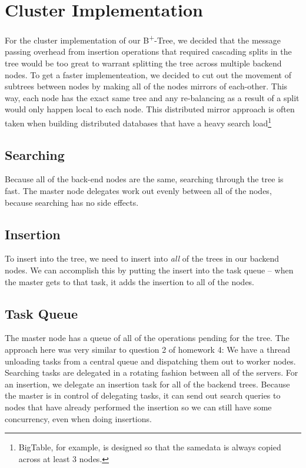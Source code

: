 \documentclass[conference]{IEEEtran}
\begin{document}
\section{Cluster Implementation}
For the cluster implementation of our B\textsuperscript{+}-Tree, we decided that
the message passing overhead from insertion operations that required cascading
splits in the tree would be too great to warrant splitting the tree across
multiple backend nodes. To get a faster implementeation, we decided to cut out
the movement of subtrees between nodes by making all of the nodes mirrors of
each-other. This way, each node has the exact same tree and any re-balancing as
a result of a split would only happen local to each node. This distributed
mirror approach is often taken when building distributed databases that have a
heavy search load\footnote{BigTable, for example, is designed so that the
samedata is always copied across at least 3 nodes.}

\subsection{Searching}
Because all of the back-end nodes are the same, searching through the tree is
fast. The master node delegates work out evenly between all of the nodes,
because searching has no side effects.

\subsection{Insertion}
To insert into the tree, we need to insert into {\em all} of the trees in our
backend nodes. We can accomplish this by putting the insert into the task queue
\--- when the master gets to that task, it adds the insertion to all of the nodes.

\subsection{Task Queue}
The master node has a queue of all of the operations pending for the tree. The
approach here was very similar to question 2 of homework 4: We have a thread
unloading tasks from a central queue and dispatching them out to worker nodes.
Searching tasks are delegated in a rotating fashion between all of the servers.
For an insertion, we delegate an insertion task for all of the backend trees.
Because the master is in control of delegating tasks, it can send out search
queries to nodes that have already performed the insertion so we can still have
some concurrency, even when doing insertions.
\end{document}
